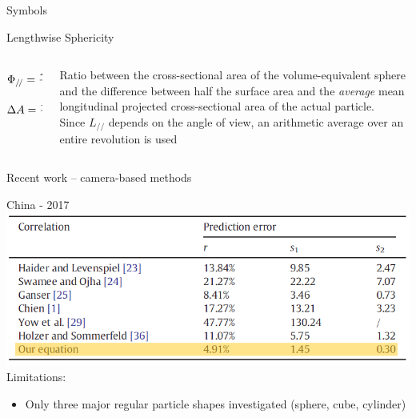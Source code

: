 \documentclass[11pt]{beamer}
\begin{document}
	\begin{frame}{Symbols}
		\begin{block}{Lengthwise Sphericity}
			\begin{columns}[T]
				\begin{column}{.4\textwidth}
					\begin{equation*}
					\Phi_{/\!/} = \dfrac{A_{\textup{eq sphere, cross}}} {\Delta A}
					\end{equation*}	
					\vfill		
					\begin{equation*}
					\Delta A = \dfrac{A_{\textup{particle}}}{2} - \bar{L_{/\!/}}
					\end{equation*}
				\end{column}
				
				\begin{column}{.6\textwidth}
					Ratio between the cross-sectional area of the volume-equivalent sphere and the difference between half the surface area and the \textit{average} mean longitudinal projected cross-sectional area of the actual particle.\\
					Since $ L_{/\!/} $ depends on the angle of view, an arithmetic average over an entire revolution is used
				\end{column}
			\end{columns}
		\end{block}
	\end{frame}

	\begin{frame}{Recent work -- camera-based methods}
		\begin{block}{China - 2017}
			\centering
			\includegraphics[width=\linewidth]{ComparisonChina.png}\\
			\flushleft
			Limitations: 
			\begin{itemize}
				\item Only three major regular particle shapes investigated (sphere, cube, cylinder)
			\end{itemize}
		\end{block}
	\end{frame}
\end{document}
